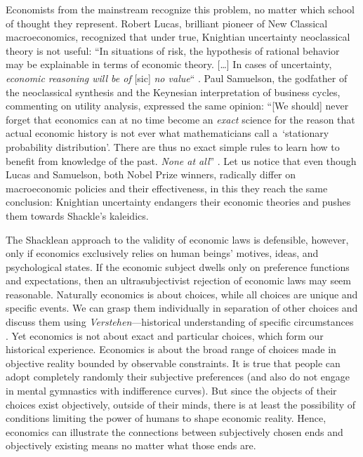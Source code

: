Economists from the mainstream recognize this problem, no matter which school of thought they represent. Robert Lucas, brilliant pioneer of New Classical macroeconomics, recognized that under true, Knightian uncertainty neoclassical theory is not useful: ``In situations of risk, the hypothesis of rational behavior may be explainable in terms of economic theory. […] In cases of uncertainty, \textit{economic reasoning will be of} [sic] \textit{no value}`` 
\parencite[][emphasis added]{lucas_understanding_1977}. %
 Paul Samuelson, the godfather of the neoclassical synthesis and the Keynesian interpretation of business cycles, commenting on utility analysis, expressed the same opinion: ``[We should] never forget that economics can at no time become an \textit{exact} science for the reason that actual economic history is not ever what mathematicians call a~‘stationary probability distribution'. There are thus no exact simple rules to learn how to benefit from knowledge of the past. \textit{None at all}'' 
\parencite[][emphasis added]{samuelson_asymmetric_2008}. %
 Let us notice that even though Lucas and Samuelson, both Nobel Prize winners, radically differ on macroeconomic policies and their effectiveness, in this they reach the same conclusion: Knightian uncertainty endangers their economic theories and pushes them towards Shackle's kaleidics.



The Shacklean approach to the validity of economic laws is defensible, however, only if economics exclusively relies on human beings' motives, ideas, and psychological states. If the economic subject dwells only on preference functions and expectations, then an ultrasubjectivist rejection of economic laws may seem reasonable. Naturally economics is about choices, while all choices are unique and specific events. We can grasp them individually in separation of other choices and discuss them using \textit{Verstehen}---historical understanding of specific circumstances 
\parencite[][]{tucker_max_1965}. %
 Yet economics is not about exact and particular choices, which form our historical experience. Economics is about the broad range of choices made in objective reality bounded by observable constraints. It is true that people can adopt completely randomly their subjective preferences (and also do not engage in mental gymnastics with indifference curves). But since the objects of their choices exist objectively, outside of their minds, there is at least the possibility of conditions limiting the power of humans to shape economic reality. Hence, economics can illustrate the connections between subjectively chosen ends and objectively existing means no matter what those ends are.




